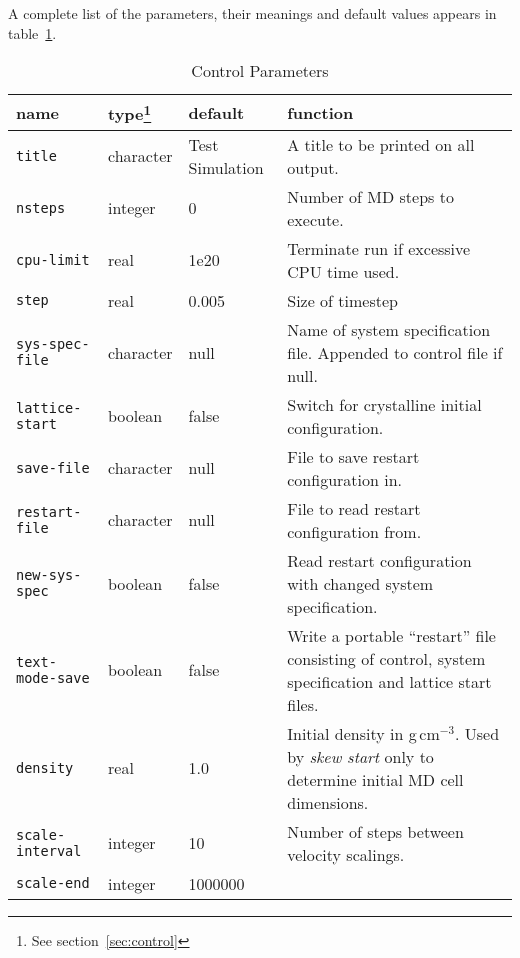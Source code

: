 \documentclass[twoside]{report}
\begin{document}
A complete list of the parameters,
their meanings and default values appears in
table~\ref{tab:parameters}. 

\begin{table}
\begin{minipage}{\textwidth}
\caption{Control Parameters}
\label{tab:parameters}
\setlength{\rightskip}{0pt plus 2cm}
\begin{tabular}{|l|l|l|p{2.9in}|}
\hline
{\bf name} & {\bf type}\footnote{See section~\ref{sec:control}} &
{\bf default} & {\bf function} \\ \hline \hline
\texttt{title} &                  character  & {\small Test Simulation} &
A title to be printed on all output. \\
\texttt{nsteps} &                 integer &                       0 &
Number of MD steps to execute. \\
\texttt{cpu-limit} &              real &                  1e20 &
Terminate run if excessive CPU time used. \\
\texttt{step} &                   real &                  0.005 &
Size of timestep \\ \hline
\texttt{sys-spec-file} &          character  &    null &
Name of system specification file.  Appended to control file if null. \\
\texttt{lattice-start} &          boolean &               false  &
Switch for crystalline initial configuration. \\
\texttt{save-file} &              character  &    null &
File to save restart configuration in. \\
\texttt{restart-file} &           character  &    null &
File to read restart configuration from. \\
\texttt{new-sys-spec} &           boolean &               false  &
Read restart configuration with changed system specification. \\
\texttt{text-mode-save} &         boolean &               false &
Write a portable ``restart'' file consisting of control, system
specification and lattice start files. \\ \hline
\texttt{density} &                real &                  1.0 &
Initial density in g\,cm$^{-3}$.  Used by {\em skew start\/} only to
determine initial MD cell dimensions. \\ \hline
\texttt{scale-interval} &         integer &               10 &
Number of steps between velocity scalings. \\
\texttt{scale-end} &              integer &               1000000 &

\end{tabular}
\end{minipage}
\end{table}
\end{document}

